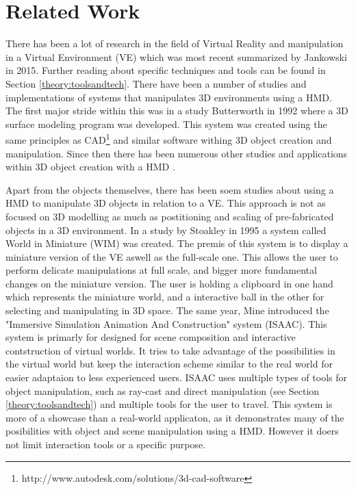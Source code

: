 \chapter{Related Work}
\label{relatedwork}
There has been a lot of research in the field of Virtual Reality and manipulation in a Virtual Environment (VE) which was most recent summarized by Jankowski in 2015\cite{interactions:Jankowski2015}. Further reading about specific techniques and tools can be found in Section \ref{theory:toolsandtech}. There have been a number of studies and implementations of systems that manipulates 3D environments using a HMD. The first major stride within this was in a study Butterworth in 1992 where a 3D surface modeling program was developed\cite{relatedwork:Butterworth1992}. This system was created using the same principles as CAD\footnote{http://www.autodesk.com/solutions/3d-cad-software} and similar software withing 3D object creation and manipulation. Since then there has been numerous other studies and applications within 3D object creation with a HMD\cite{relatedwork:bowman1996conceptual} \cite{relatedwork:moshell1995research} \cite{relatedwork:liang1994jdcad}.

Apart from the objects themselves, there has been soem studies about using a HMD to manipulate 3D objects in relation to a VE. This approach is not as focused on 3D modelling as much as postitioning and scaling of pre-fabricated objects in a 3D environment. In a study by Stoakley in 1995 a system called World in Miniature (WIM) was created\cite{relatedwork:stoakley1995virtual}. The premis of this system is to display a miniature version of the VE aswell as the full-scale one. This allows the user to perform delicate manipulations at full scale, and bigger more fundamental changes on the miniature version. The user is holding a clipboard in one hand which represents the miniature world, and a interactive ball in the other for selecting and manipulating in 3D space. The same year, Mine introduced the "Immersive Simulation
Animation And Construction" system (ISAAC)\cite{relatedwork:mine1995isaac}. This system is primarly for designed for scene composition and interactive contstruction of virtual worlds. It tries to take advantage of the possibilities in the virtual world but keep the interaction scheme similar to the real world for easier adaptaion to less experienced users. ISAAC uses multiple types of tools for object manipulation, such as ray-cast and direct manipulation (see Section \ref{theory:toolsandtech}) and multiple tools for the user to travel. This system is more of a showcase than a real-world applicaton, as it demonstrates many of the posibilities with object and scene manipulation using a HMD. However it doers not limit interaction tools or a specific purpose.

